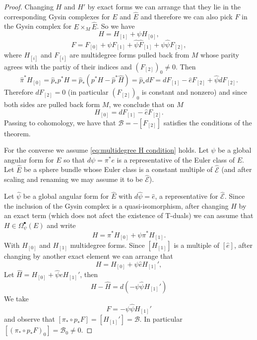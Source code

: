 \documentclass[10pt,a4paper]{amsart}
\newcommand{\mc}[1]{\text{$\mathcal{#1}$}}
\begin{document}
\begin{proof}
Changing $H$ and $H'$ by exact forms we can arrange that they lie in the corresponding Gysin complexes for $E$ and $\hat{E}$ and therefore we can also pick $F$ in the Gysin complex for $E\times_M \hat{E}$. So we have
\begin{equation}\label{eq:H looks like}
H = H_{[1]} +\psi  H_{[0]},
\end{equation}
\begin{equation}\label{eq:F looks like}
F = F_{[0]} +  \psi F_{[1]} +\hat\psi \hat{F}_{[1]} + \psi \hat\psi F_{[2]} ,
\end{equation}
where $H_{[i]}$ and $F_{[i]}$ are multidegree forms pulled back from $M$ whose parity agrees with the partiy of their indices and $(F_{[2]})_0 \neq 0$. Then
\[\hat{\pi}^*H_{[0]} = \hat{p}_* p^* H =\hat{p}_* (p^*H -\hat{p}^* \hat{H}) = \hat{p}_* dF = dF_{[1]} - \hat{e} F_{[2]} + \hat{\psi} dF_{[2]}. \]
Therefore $dF_{[2]}=0$ (in particular $(F_{[2]})_0$ is constant and nonzero) and since both sides are pulled back form $M$, we conclude that on $M$
\[H_{[0]}  = dF_{[1]} - \hat{e} F_{[2]}.\]
Passing to cohomology, we have that $\mc{B} =- [F_{[2]}]$ satisfies the conditions of the theorem. 

For the converse we assume \eqref{eq:multidegree H condition} holds. Let $\psi$ be a global angular form for $E$ so that $d\psi = \pi^*e$ is a representative of the Euler class of $E$. Let $\hat{E}$ be a sphere bundle whose Euler class is a constant multiple of $\hat{\mc{E}}$ (and after scaling and renaming we may assume it to be $\hat{\mc{E}}$).

Let $\hat{\psi}$ be a global angular form for $\hat{E}$ with $d\hat{\psi} = \hat{e}$, a representative for $\hat{\mc{E}}$. Since the inclusion of the Gysin complex is a quasi-isomorphism, after changing $H$ by an exact term (which does not afect the existence of T-duals) we can assume that $H \in \Omega^\bullet_\psi(E)$ and write
\[H = \pi^*H_ {[0]} + \psi \pi^*H_{[1]}.\]
With $H_{[0]}$ and $H_{[1]}$ multidegree forms. Since $[H_{[1]}]$ is a multiple of $[\hat{e}]$, after changing by another exact element we can arrange that
\[H = H_{[0]} + \psi \hat{e} H_{[1]}',\]
Let $\hat{H} = H_{[0]} + \hat{\psi} e H_{[1]}'$, then
\[H - \hat{H} = d(-\psi\hat{\psi} H_{[1]}')\]
We take
\[F = -\psi\hat{\psi} H_{[1]}'\]
 and observe that $[\pi_*\circ p_* F] = [H_{[1]}'] = \mc{B}$. In particular $[(\pi_*\circ p_* F)_0]=\mc{B}_0 \neq 0$.
\end{proof}
\end{document}
